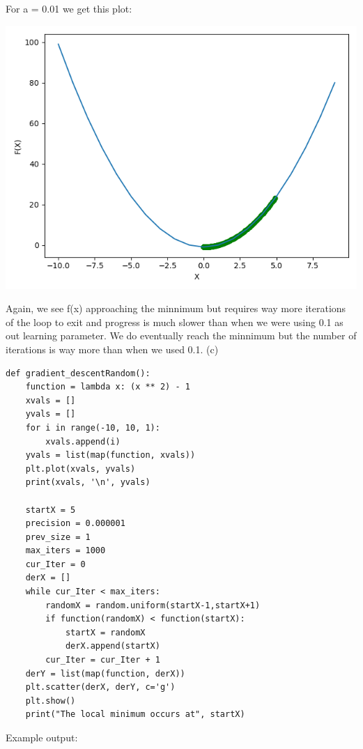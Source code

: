 \documentclass[11pt]{article} %
\begin{document}
\newline
\newline
For a = 0.01 we get this plot:
\begin{center}
	\includegraphics[scale = 0.5]{a002.png}
\end{center}
Again, we see f(x) approaching the minnimum but requires way more iterations of the loop to exit and progress is much slower than when we were using 0.1 as out learning parameter. We do eventually reach the minnimum but the number of iterations is way more than when we used 0.1.
\newline
\newline
(c)
\begin{verbatim}
def gradient_descentRandom():
    function = lambda x: (x ** 2) - 1
    xvals = []
    yvals = []
    for i in range(-10, 10, 1):
        xvals.append(i)
    yvals = list(map(function, xvals))
    plt.plot(xvals, yvals)
    print(xvals, '\n', yvals)

    startX = 5
    precision = 0.000001
    prev_size = 1
    max_iters = 1000
    cur_Iter = 0
    derX = []
    while cur_Iter < max_iters:
        randomX = random.uniform(startX-1,startX+1)
        if function(randomX) < function(startX):
            startX = randomX
            derX.append(startX)
        cur_Iter = cur_Iter + 1
    derY = list(map(function, derX))
    plt.scatter(derX, derY, c='g')
    plt.show()
    print("The local minimum occurs at", startX)
\end{verbatim}
Example output:
\end{document}
